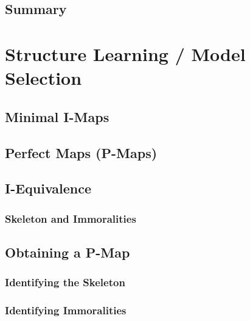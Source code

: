         \subsection{Summary} %

    \section{Structure Learning / Model Selection} %

        \subsection{Minimal I-Maps} %

        \subsection{Perfect Maps (P-Maps)} %

        \subsection{I-Equivalence} %

            \subsubsection{Skeleton and Immoralities} %

        \subsection{Obtaining a P-Map} %

            \subsubsection{Identifying the Skeleton} %

            \subsubsection{Identifying Immoralities} %

